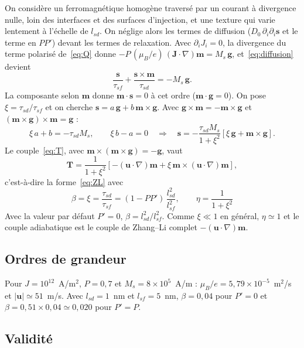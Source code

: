 \documentclass[11pt,a4paper]{article}
\newcommand{\vm}{\bm{m}}
\newcommand{\vs}{\bm{s}}
\newcommand{\vu}{\bm{u}}
\newcommand{\vg}{\bm{g}}
\newcommand{\vJ}{\bm{J}}
\newcommand{\vT}{\bm{T}}
\begin{document}
On considère un ferromagnétique homogène traversé par un courant à divergence nulle, loin des
interfaces et des surfaces d'injection, et une texture qui varie lentement à l'échelle de
$l_{sd}$. On néglige alors les termes de diffusion ($D_0\,\partial_i\partial_i\vs$ et le terme en
$PP'$) devant les termes de relaxation. Avec $\partial_iJ_i = 0$, la divergence du terme polarisé
de~\eqref{eq:Q} donne $-P\,(\mu_B/e)\,(\vJ\cdot\nabla)\vm = M_s\,\vg$, et~\eqref{eq:diffusion}
devient
\begin{equation}
  \frac{\vs}{\tau_{sf}} + \frac{\vs\times\vm}{\tau_{sd}} = -M_s\,\vg .
\end{equation}
La composante selon $\vm$ donne $\vm\cdot\vs = 0$ à cet ordre ($\vm\cdot\vg = 0$). On pose
$\xi = \tau_{sd}/\tau_{sf}$ et on cherche $\vs = a\,\vg + b\,\vm\times\vg$. Avec
$\vg\times\vm = -\vm\times\vg$ et $(\vm\times\vg)\times\vm = \vg$ :
\begin{equation}
  \xi\,a + b = -\tau_{sd}M_s,\qquad \xi\,b - a = 0
  \quad\Longrightarrow\quad
  \vs = -\frac{\tau_{sd}M_s}{1+\xi^2}\left[\xi\,\vg + \vm\times\vg\right].
  \label{eq:s_local}
\end{equation}
Le couple~\eqref{eq:T}, avec $\vm\times(\vm\times\vg) = -\vg$, vaut
\begin{equation}
  \vT = \frac{1}{1+\xi^2}\left[-(\vu\cdot\nabla)\vm + \xi\,\vm\times(\vu\cdot\nabla)\vm\right],
\end{equation}
c'est-à-dire la forme~\eqref{eq:ZL} avec
\begin{equation}
  \boxed{\;
  \beta = \xi = \frac{\tau_{sd}}{\tau_{sf}} = (1-PP')\,\frac{l_{sd}^2}{l_{sf}^2},
  \qquad
  \eta = \frac{1}{1+\xi^2}
  \;}
  \label{eq:beta}
\end{equation}
Avec la valeur par défaut $P'=0$, $\beta = l_{sd}^2/l_{sf}^2$. Comme $\xi\ll 1$ en général, $\eta\simeq 1$ et le couple
adiabatique est le couple de Zhang--Li \og complet \fg{} $-(\vu\cdot\nabla)\vm$.

\subsection{Ordres de grandeur}

Pour $J = 10^{12}$~A/m$^2$, $P = 0{,}7$ et $M_s = 8\times10^5$~A/m :
$\mu_B/e = 5{,}79\times10^{-5}$~m$^2$/s et $|\vu| \simeq 51$~m/s. Avec $l_{sd} = 1$~nm et
$l_{sf} = 5$~nm, $\beta = 0{,}04$ pour $P'=0$ et $\beta = 0{,}51\times0{,}04 \simeq 0{,}020$ pour
$P'=P$.

\subsection{Validité}
\end{document}
